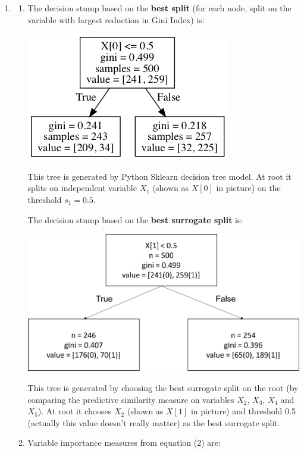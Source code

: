 \documentclass[paper=letter, fontsize=12pt]{article}
\begin{document}
\begin{enumerate}[label=(\alph*)]
	\item 
	\begin{enumerate}[label=(\roman*)]
		\item 
		The decision stump based on the \textbf{best split} (for each node, split on the variable with largest reduction in Gini Index) is:
		
		\includegraphics[scale=0.6]{tree_best_split.png}
		
		This tree is generated by Python Sklearn decision tree model. At root it splits on independent variable $X_1$ (shown as $X[0]$ in picture) on the threshold $s_1 = 0.5$.
		
		The decision stump based on the \textbf{best surrogate split} is:
		
		\includegraphics[scale=0.4]{tree_best_surrogate_split.png}
		
		This tree is generated by choosing the best surrogate split on the root (by comparing the predictive similarity measure on variables $X_2$, $X_3$, $X_4$ and $X_5$). At root it chooses $X_2$ (shown as $X[1]$ in picture) and threshold 0.5 (actually this value doesn't really matter) as the best surrogate split.
		
		\item Variable importance measures from equation (2) are:
		

\end{enumerate}
\end{enumerate}
\end{document}
